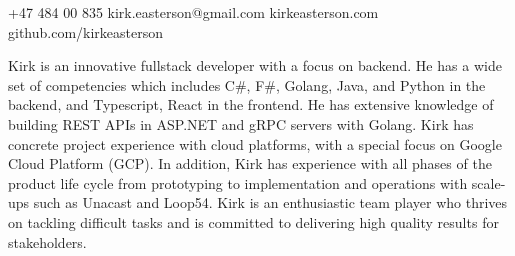 \documentclass[10pt,letterpaper]{article}
\begin{document}


\begin{center}\spacedhrule{-.6em}{-.6em}\end{center}
 \hfill \small +47 484 00 835 \hfill {} \hfill kirk.easterson@gmail.com \hfill {} \hfill kirkeasterson.com \hfill {} \hfill github.com/kirkeasterson \hfill {}
\begin{center}\spacedhrule{-.4em}{0em}\end{center}



Kirk is an innovative fullstack developer with a focus on backend. He has a wide set of competencies which includes C\#, F\#, Golang, Java, and Python in the backend, and Typescript, React in the frontend. He has extensive knowledge of building REST APIs in ASP.NET and gRPC servers with Golang. Kirk has concrete project experience with cloud platforms, with a special focus on Google Cloud Platform (GCP). In addition, Kirk has experience with all phases of the product life cycle from prototyping to implementation and operations with scale-ups such as Unacast and Loop54. Kirk is an enthusiastic team player who thrives on tackling difficult tasks and is committed to delivering high quality results for stakeholders.


\spacedhrule{0.6em}{-0.7em}
\end{document}
